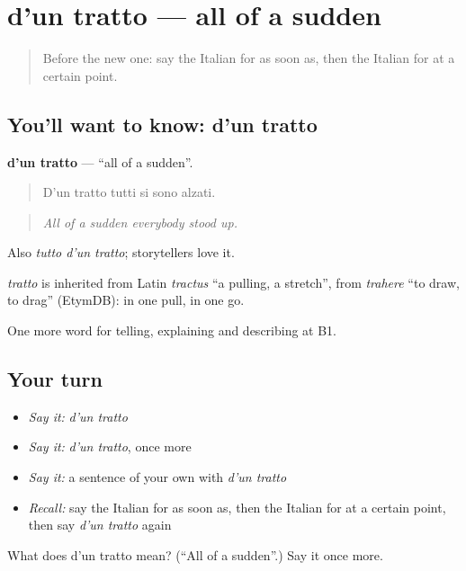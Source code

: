 \section[d'un tratto]{d'un tratto — all of a sudden}

\label{lesson:IT-C274-d-un-tratto}



\begin{quote}
Before the new one: say the Italian for as soon as, then the Italian for at a certain point.
\end{quote}

\subsection*{You'll want to know: d'un tratto}
\textbf{d'un tratto} — \textquotedblleft{}all of a sudden\textquotedblright{}.

\begin{quote}
D'un tratto tutti si sono alzati.
\end{quote}

\begin{quote}
\emph{All of a sudden everybody stood up.}
\end{quote}

Also \emph{tutto d'un tratto}; storytellers love it.

\begin{cousinweb}
\emph{tratto} is inherited from Latin \emph{tractus} \textquotedblleft{}a pulling, a stretch\textquotedblright{}, from \emph{trahere} \textquotedblleft{}to draw, to drag\textquotedblright{} (EtymDB): in one pull, in one go.
\end{cousinweb}

\begin{grammarlens}[title={What you've built}]
One more word for telling, explaining and describing at B1.
\end{grammarlens}

\subsection*{Your turn}
\begin{itemize}
\raggedright
  \item \emph{Say it:} \emph{d'un tratto}
  \item \emph{Say it:} \emph{d'un tratto}, once more
  \item \emph{Say it:} a sentence of your own with \emph{d'un tratto}
  \item \emph{Recall:} say the Italian for as soon as, then the Italian for at a certain point, then say \emph{d'un tratto} again
\end{itemize}

\begin{tcolorbox}[breakable,colback=teal!4,colframe=teal!35!black,title={Before you move on}]
What does d'un tratto mean? (\textquotedblleft{}All of a sudden\textquotedblright{}.) Say it once more.
\end{tcolorbox}
